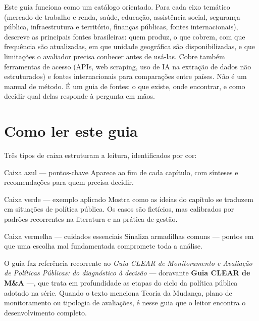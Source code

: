\documentclass[12pt, a4paper, openany]{book}
\begin{document}
Este guia funciona como um catálogo orientado. Para cada eixo temático
(mercado de trabalho e renda, saúde, educação, assistência social,
segurança pública, infraestrutura e território, finanças públicas, fontes
internacionais), descreve as principais fontes brasileiras: quem produz,
o que cobrem, com que frequência são atualizadas, em que unidade
geográfica são disponibilizadas, e que limitações o avaliador precisa
conhecer antes de usá-las. Cobre também ferramentas de acesso (APIs, web
scraping, uso de IA na extração de dados não estruturados) e fontes
internacionais para comparações entre países. Não é um manual de método.
É um guia de fontes: o que existe, onde encontrar, e como decidir qual
delas responde à pergunta em mãos.
\newpage

\thispagestyle{empty}
\section*{Como ler este guia}
Três tipos de caixa estruturam a leitura, identificados por cor:
\vspace{0.3cm}
\begin{boxdica}{Caixa azul --- pontos-chave}
Aparece ao fim de cada capítulo, com sínteses e recomendações para quem
precisa decidir.
\end{boxdica}
\begin{boxexemplo}{Caixa verde --- exemplo aplicado}
Mostra como as ideias do capítulo se traduzem em situações de política
pública. Os casos são fictícios, mas calibrados por padrões recorrentes
na literatura e na prática de gestão.
\end{boxexemplo}
\begin{boxatencao}{Caixa vermelha --- cuidados essenciais}
Sinaliza armadilhas comuns --- pontos em que uma escolha mal fundamentada
compromete toda a análise.
\end{boxatencao}
\vspace{0.5cm}
\noindent O guia faz referência recorrente ao \textit{Guia CLEAR de
Monitoramento e Avaliação de Políticas Públicas: do diagnóstico à decisão}
\citep{Lima2025} --- doravante \textbf{Guia CLEAR de M\&A} ---, que trata
em profundidade as etapas do ciclo da política pública adotado na série.
Quando o texto menciona Teoria da Mudança, plano de monitoramento ou
tipologia de avaliações, é nesse guia que o leitor encontra o
desenvolvimento completo.
\newpage

\tableofcontents
\end{document}
